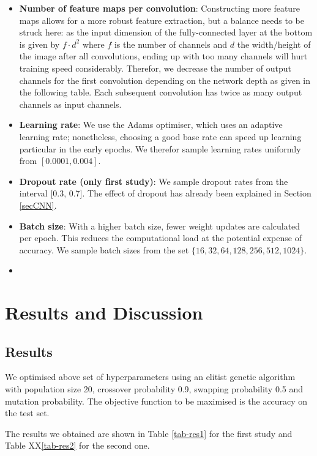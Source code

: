 \documentclass[british,12p]{article}
\begin{document}
\begin{itemize}
    	\item \textbf{Number of feature maps per convolution}: Constructing more feature maps allows for a more robust feature extraction, but a balance needs to be struck here: as the input dimension of the fully-connected layer at the bottom is given by $f \cdot d^2$ where $f$ is the number of channels and $d$ the width/height of the image after all convolutions, ending up with too many channels will hurt training speed considerably. Therefor, we decrease the number of output channels for the first convolution depending on the network depth as given in the following table. Each subsequent convolution has twice as many output channels as input channels. 
    	\item \textbf{Learning rate}: We use the Adams optimiser, which uses an adaptive learning rate; nonetheless, choosing a good base rate can speed up learning particular in the early epochs. We therefor sample learning rates uniformly from $[0.0001, 0.004]$.
    	\item \textbf{Dropout rate (only first study)}: We sample dropout rates from the interval [0.3, 0.7]. The effect of dropout has already been explained in Section \ref{secCNN}.
    	\item \textbf{Batch size}: With a higher batch size, fewer weight updates are calculated per epoch. This reduces the computational load at the potential expense of accuracy. We sample batch sizes from the set $\{16, 32, 64, 128, 256, 512, 1024\}$.
    	\item 
    \end{itemize}
    
    \section{Results and Discussion}
    
    \subsection{Results}
    
    We optimised above set of hyperparameters using an elitist genetic algorithm  with population size 20, crossover probability 0.9, swapping probability 0.5 and mutation probability. The objective function to be maximised is the accuracy on the test set. 
    
    The results we obtained are shown in Table \ref{tab-res1} for the first study and Table XX\ref{tab-res2} for the second one.
\end{document}
